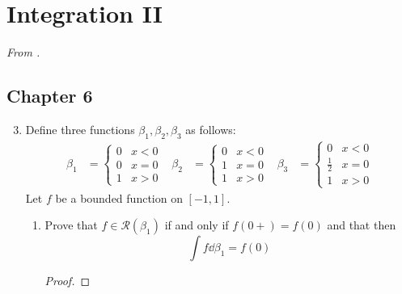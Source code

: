 \documentclass[../psets.tex]{subfiles}
\begin{document}
\section{Integration II}
\emph{From \textcite{bib:Rudin}.}
\subsection*{Chapter 6}
\begin{enumerate}[label={\textbf{\arabic*.}}]
    \setcounter{enumi}{2}
    \item {}Define three functions $\beta_1,\beta_2,\beta_3$ as follows:
    \begin{align*}
        \beta_1 &=
        \begin{cases}
            0 & x<0\\
            0 & x=0\\
            1 & x>0
        \end{cases}&
        \beta_2 &=
        \begin{cases}
            0 & x<0\\
            1 & x=0\\
            1 & x>0
        \end{cases}&
        \beta_3 &=
        \begin{cases}
            0 & x<0\\
            \tfrac{1}{2} & x=0\\
            1 & x>0
        \end{cases}
    \end{align*}
    Let $f$ be a bounded function on $[-1,1]$.
    \begin{enumerate}
        \item Prove that $f\in\mathscr{R}(\beta_1)$ if and only if $f(0+)=f(0)$ and that then
        \begin{equation*}
            \int f\dd{\beta_1} = f(0)
        \end{equation*}
        \begin{proof}

\end{proof}
\end{enumerate}
\end{enumerate}
\end{document}
